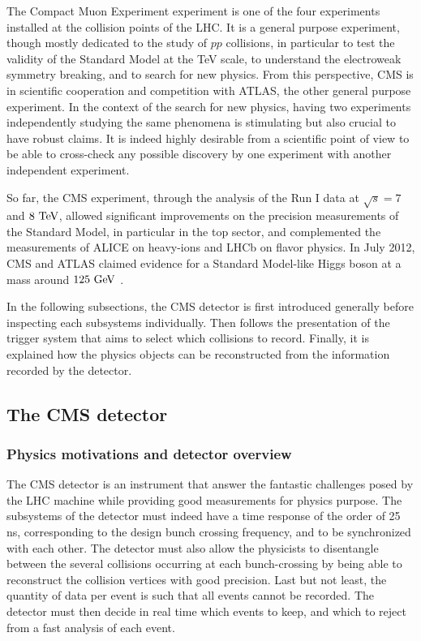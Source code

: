     The Compact Muon Experiment experiment is one of the four experiments installed
    at the collision points of the LHC. It is a general purpose experiment, though mostly dedicated
    to the study of $pp$ collisions, in particular to test the validity of the Standard
    Model at the TeV scale, to understand the electroweak symmetry breaking, and to search for new physics. From this
    perspective, CMS is in scientific cooperation and competition with ATLAS, the
    other general purpose experiment. In the context of the search for new physics,
    having two experiments independently studying the same phenomena is
    stimulating but also crucial to have robust claims. It is indeed highly desirable
    from a scientific point of view to be able to cross-check any possible discovery
    by one experiment with another independent experiment.

    So far, the CMS experiment, through the analysis of the Run I data at
    $\sqrt{s} = 7$ and $8~\text{TeV}$, allowed significant improvements on the precision measurements
    of the Standard Model, in particular in the top sector, and complemented the
    measurements of ALICE on heavy-ions and LHCb on flavor physics. In July 2012, CMS
    and ATLAS claimed evidence for a Standard Model-like Higgs boson at a mass around
    $125~\text{GeV}$ \cite{CMSHiggs, ATLASHiggs}.

    In the following subsections, the CMS detector is first introduced generally before inspecting
    each subsystems individually. Then follows the presentation of the trigger system
    that aims to select which collisions to record. Finally, it is
    explained how the physics objects can be reconstructed from the information
    recorded by the detector.

    \subsection{The CMS detector}

        \subsubsection{Physics motivations and detector overview}

    The CMS detector \cite{CMSdetector} is an instrument that answer the fantastic
    challenges posed by the LHC machine while providing good measurements for physics purpose.
    The subsystems of the detector must indeed have a time response of the order of 25 ns,
    corresponding to the design bunch crossing frequency, and to be synchronized with
    each other. The detector must also allow the physicists to disentangle between the
    several collisions occurring at each bunch-crossing by being able to
    reconstruct the collision vertices with good precision. Last but not least,
    the quantity of data per event is such that all events cannot be recorded. The
    detector must then decide in real time which events to keep, and which to reject
    from a fast analysis of each event.

